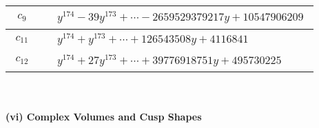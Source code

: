 \documentclass[1p]{elsarticle_modified}
\theoremstyle{definition}
\begin{document}
\begin{tabular}{m{50pt}|m{274pt}}
\hline $$\begin{aligned}c_{9}\end{aligned}$$&$\begin{aligned}
&y^{174}-39 y^{173}+\cdots-2659529379217 y+10547906209
\end{aligned}$\\
\hline $$\begin{aligned}c_{11}\end{aligned}$$&$\begin{aligned}
&y^{174}+y^{173}+\cdots+126543508 y+4116841
\end{aligned}$\\
\hline $$\begin{aligned}c_{12}\end{aligned}$$&$\begin{aligned}
&y^{174}+27 y^{173}+\cdots+39776918751 y+495730225
\end{aligned}$\\
\hline
\end{tabular}\\~\\
\newpage\flushleft \textbf{(vi) Complex Volumes and Cusp Shapes}
\end{document}
